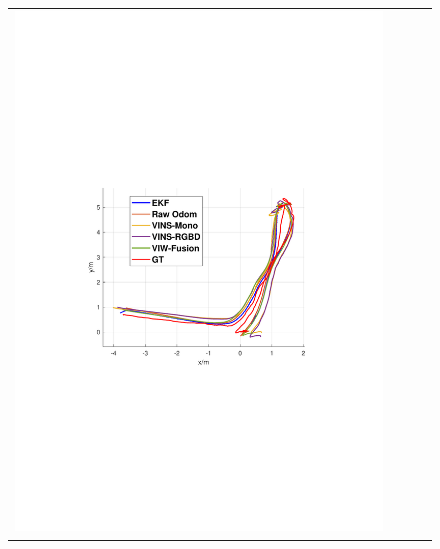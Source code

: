 \documentclass[conference]{IEEEtran}
\begin{document}
\begin{figure}
\begin{center}
\begin{tabular}{cccc}
				\includegraphics[scale=0.26]{fig/office3.pdf}&

\end{tabular}
\end{center}
\end{figure}
\end{document}
